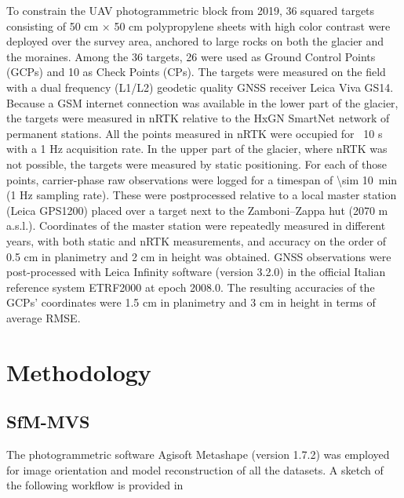 To constrain the UAV photogrammetric block from 2019, 36 squared targets consisting
of 50 cm × 50 cm polypropylene sheets with high color contrast were deployed over the
survey area, anchored to large rocks on both the glacier and the moraines. 
Among the 36 targets, 26 were used as Ground Control Points (GCPs) and 10 as Check Points (CPs).
The targets were measured on the field with a dual frequency (L1/L2) geodetic quality
GNSS receiver Leica Viva GS14. Because a GSM internet connection was available in the lower
part of the glacier, the targets were measured in nRTK relative to the HxGN SmartNet
network of permanent stations. All the points measured in nRTK were occupied for ~10 s
with a 1 Hz acquisition rate. In the upper part of the glacier, where nRTK was not possible,
the targets were measured by static positioning. For each of those points, carrier-phase
raw observations were logged for a timespan of \SI{\sim 10}{\minute} (1 Hz sampling rate).
These were postprocessed relative to a local master station (Leica GPS1200) placed 
over a target next to the Zamboni–Zappa hut (2070 m a.s.l.). 
Coordinates of the master station were repeatedly measured in different years, with both
static and nRTK measurements, and accuracy on the order of 0.5 cm in planimetry and 2 cm 
in height was obtained. 
GNSS observations were post-processed with Leica Infinity software (version 3.2.0) in the official Italian reference system ETRF2000 at epoch 2008.0. 
The resulting accuracies of the GCPs' coordinates were 1.5 cm in planimetry and 3 cm in height in terms of average RMSE.

\section{Methodology}\label{sec:2:methods}

\subsection{SfM-MVS}

The photogrammetric software Agisoft Metashape (version 1.7.2) was employed for image orientation and model reconstruction of all the datasets. A sketch of the following
workflow is provided in 

